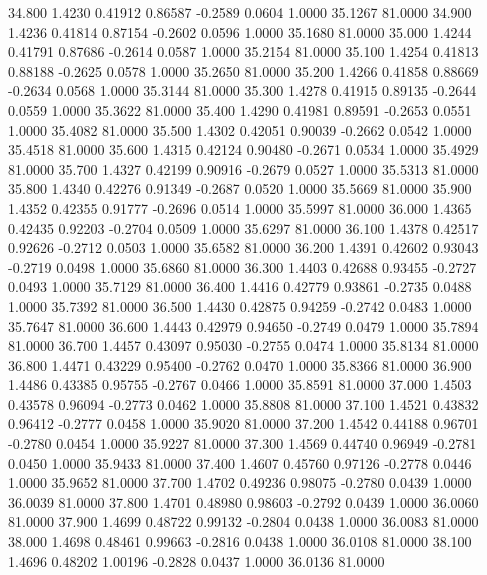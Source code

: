   34.800   1.4230   0.41912   0.86587  -0.2589   0.0604   1.0000  35.1267  81.0000
  34.900   1.4236   0.41814   0.87154  -0.2602   0.0596   1.0000  35.1680  81.0000
  35.000   1.4244   0.41791   0.87686  -0.2614   0.0587   1.0000  35.2154  81.0000
  35.100   1.4254   0.41813   0.88188  -0.2625   0.0578   1.0000  35.2650  81.0000
  35.200   1.4266   0.41858   0.88669  -0.2634   0.0568   1.0000  35.3144  81.0000
  35.300   1.4278   0.41915   0.89135  -0.2644   0.0559   1.0000  35.3622  81.0000
  35.400   1.4290   0.41981   0.89591  -0.2653   0.0551   1.0000  35.4082  81.0000
  35.500   1.4302   0.42051   0.90039  -0.2662   0.0542   1.0000  35.4518  81.0000
  35.600   1.4315   0.42124   0.90480  -0.2671   0.0534   1.0000  35.4929  81.0000
  35.700   1.4327   0.42199   0.90916  -0.2679   0.0527   1.0000  35.5313  81.0000
  35.800   1.4340   0.42276   0.91349  -0.2687   0.0520   1.0000  35.5669  81.0000
  35.900   1.4352   0.42355   0.91777  -0.2696   0.0514   1.0000  35.5997  81.0000
  36.000   1.4365   0.42435   0.92203  -0.2704   0.0509   1.0000  35.6297  81.0000
  36.100   1.4378   0.42517   0.92626  -0.2712   0.0503   1.0000  35.6582  81.0000
  36.200   1.4391   0.42602   0.93043  -0.2719   0.0498   1.0000  35.6860  81.0000
  36.300   1.4403   0.42688   0.93455  -0.2727   0.0493   1.0000  35.7129  81.0000
  36.400   1.4416   0.42779   0.93861  -0.2735   0.0488   1.0000  35.7392  81.0000
  36.500   1.4430   0.42875   0.94259  -0.2742   0.0483   1.0000  35.7647  81.0000
  36.600   1.4443   0.42979   0.94650  -0.2749   0.0479   1.0000  35.7894  81.0000
  36.700   1.4457   0.43097   0.95030  -0.2755   0.0474   1.0000  35.8134  81.0000
  36.800   1.4471   0.43229   0.95400  -0.2762   0.0470   1.0000  35.8366  81.0000
  36.900   1.4486   0.43385   0.95755  -0.2767   0.0466   1.0000  35.8591  81.0000
  37.000   1.4503   0.43578   0.96094  -0.2773   0.0462   1.0000  35.8808  81.0000
  37.100   1.4521   0.43832   0.96412  -0.2777   0.0458   1.0000  35.9020  81.0000
  37.200   1.4542   0.44188   0.96701  -0.2780   0.0454   1.0000  35.9227  81.0000
  37.300   1.4569   0.44740   0.96949  -0.2781   0.0450   1.0000  35.9433  81.0000
  37.400   1.4607   0.45760   0.97126  -0.2778   0.0446   1.0000  35.9652  81.0000
  37.700   1.4702   0.49236   0.98075  -0.2780   0.0439   1.0000  36.0039  81.0000
  37.800   1.4701   0.48980   0.98603  -0.2792   0.0439   1.0000  36.0060  81.0000
  37.900   1.4699   0.48722   0.99132  -0.2804   0.0438   1.0000  36.0083  81.0000
  38.000   1.4698   0.48461   0.99663  -0.2816   0.0438   1.0000  36.0108  81.0000
  38.100   1.4696   0.48202   1.00196  -0.2828   0.0437   1.0000  36.0136  81.0000
